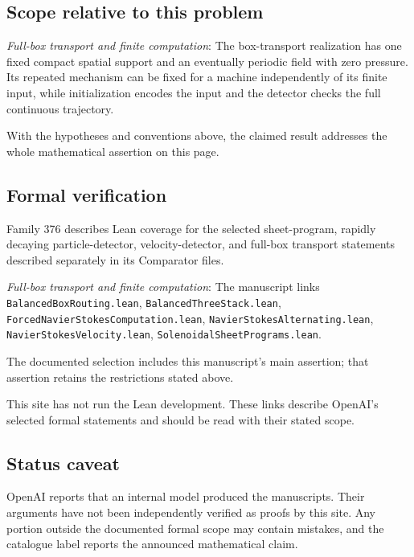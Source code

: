 \documentclass[11pt]{article}
\begin{document}
\subsection{Scope relative to this problem}
\textit{Full-box transport and finite computation}: The box-transport realization has one fixed compact spatial support and an eventually periodic field with zero pressure. Its repeated mechanism can be fixed for a machine independently of its finite input, while initialization encodes the input and the detector checks the full continuous trajectory.

With the hypotheses and conventions above, the claimed result addresses the whole mathematical assertion on this page.

\subsection{Formal verification}
Family 376 describes Lean coverage for the selected sheet-program, rapidly decaying particle-detector, velocity-detector, and full-box transport statements described separately in its Comparator files.

\textit{Full-box transport and finite computation}: The manuscript links \texttt{BalancedBoxRouting.lean}, \texttt{BalancedThreeStack.lean}, \texttt{ForcedNavierStokesComputation.lean}, \texttt{NavierStokesAlternating.lean}, \texttt{NavierStokesVelocity.lean}, \texttt{SolenoidalSheetPrograms.lean}.

The documented selection includes this manuscript’s main assertion; that assertion retains the restrictions stated above.

This site has not run the Lean development. These links describe OpenAI’s selected formal statements and should be read with their stated scope.

\subsection{Status caveat}
OpenAI reports that an internal model produced the manuscripts. Their arguments have not been independently verified as proofs by this site. Any portion outside the documented formal scope may contain mistakes, and the catalogue label reports the announced mathematical claim.
\end{document}
